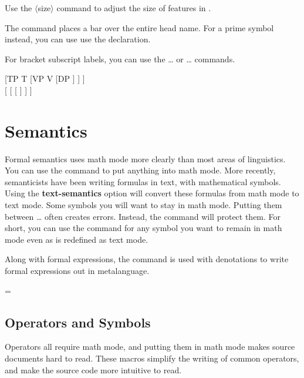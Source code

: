 \documentclass{article}
\newcommand{\structure}{\color{KUBlue}}				%
\newcommand{\cbl}{{\color{green!60!black}{\{}}}			%
\newcommand{\cbr}{{\color{green!60!black}{\}}}}			%
\newcommand{\mathbit}[1]{{\color{green!60!black}{\$}}#1{\color{green!60!black}{\$}}}  %
\newcommand{\comm}[2]{{\rmfamily{\structure{$\backslash$#1}}\cbl#2\cbr}} %
\newcommand{\decla}[1]{{\rmfamily{\structure{$\backslash$#1}}}}  %
\newcommand{\lat}[1]{{\color{KUBlue}\bfseries\ttfamily #1}}		%
\begin{document}
Use the \comm{featuresize}{$\langle$size$\rangle$} command to adjust the size of features in .

The  command places a bar over the entire head name.  For a prime symbol instead, you can use use the \decla{pri} declaration.

For bracket subscript labels, you can use the \comm{ix}{\ldots} or \comm{ux}{\ldots} commands. 

\begin{center}
	  \cbl [\cbr\comm{ux}{TP}   \comm{head}{T} [\comm{ux}{VP} \comm{head}{V}  [\comm{ux}{DP}  ] ] ]  \\
	 {[}  [  [   ] ] ]
\end{center}


 
\section{Semantics}

Formal semantics uses math mode more clearly than most areas of linguistics.  You can use the  command to put anything into math mode. 
More recently, semanticists have been writing formulas in text, with mathematical symbols.  Using the \lat{text-semantics} option will convert these formulas from math mode to text mode.  Some symbols you will want to stay in math mode.  Putting them between \mathbit{\ldots} often creates errors. Instead, the  command will protect them.  For short, you can use the  command for any symbol you want to remain in math mode even as  is redefined as text mode.

 Along with formal expressions, the   command is used with denotations to write formal expressions out in metalanguage.
 
  =  \\


\subsection{Operators and Symbols}

Operators all require math mode, and putting them in math mode makes source documents hard to read.  These macros simplify the writing of common operators, and make the source code more intuitive to read. 
\end{document}
